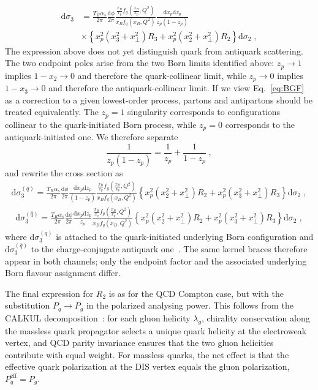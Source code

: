 \documentclass[a4paper,11pt]{article}
\begin{document}
\begin{align}\label{eq:BGF}
  \mathrm{d}\sigma_3 &= \frac{T_R\alpha_s}{2\pi}\frac{\mathrm{d}\phi}{2\pi}
    \frac{\frac{x_B}{x_p} f_g\!\left(\frac{x_B}{x_p},Q^2\right)}{ x_B f_q\!\left( x_B ,Q^2\right)}
    \frac{\mathrm{d} x_p \mathrm{d}z_p}{z_p(1-z_p)} \\\nonumber
    & \times \left\{ x_p^2 ( x_3^2 + x_\perp^2 ) R_3 +
        x_p^2 (x_2^2 + x_\perp^2) R_2 \right\} \mathrm{d} \sigma_2\;,
\end{align}
The expression above does not yet distinguish quark from antiquark scattering. The two endpoint poles arise from the two Born limits identified above: $z_p\to1$ implies $1-x_2\to0$ and therefore the quark-collinear limit, while $z_p\to0$ implies $1-x_3\to0$ and therefore the antiquark-collinear limit. If we
view Eq.~\eqref{eq:BGF} as a correction to a given lowest-order process,
partons and antipartons should be treated equivalently. The $z_p = 1$ singularity corresponds to configurations collinear to the quark-initiated Born process, while $z_p = 0$ corresponds to the antiquark-initiated one. We therefore separate
\begin{equation}
\frac{1}{z_{p}(1-z_{p})}=\frac{1}{z_{p}}+\frac{1}{1-z_{p}}\;,
\label{eq:zp-partfrac}
\end{equation}
and rewrite the cross section as
\begin{align}
\mathrm{d}\sigma_3^{(q)} = \frac{T_R\alpha_s}{2\pi}\frac{\mathrm{d}\phi}{2\pi}
\frac{\mathrm{d}x_p\mathrm{d}z_p}{(1-z_p)} \frac{\frac{x_B}{x_p}f_g(\frac{x_B}{x_p}, Q^2)}{x_Bf_q(x_B, Q^2)}
\left\{x_p^2(x_2^2+x_\perp^2)R_2+x_p^2(x_3^2+x_\perp^2)R_3\right\}\mathrm{d} \sigma_2\;,
\end{align}
\begin{align}
\mathrm{d}\sigma_3^{(\bar q)} = \frac{T_R\alpha_s}{2\pi}\frac{\mathrm{d}\phi}{2\pi}
\frac{\mathrm{d}x_p\mathrm{d}z_p}{z_p} \frac{\frac{x_B}{x_p}f_g(\frac{x_B}{x_p}, Q^2)}{x_Bf_q(x_B, Q^2)}
\left\{x_p^2(x_2^2+x_\perp^2)R_2+x_p^2(x_3^2+x_\perp^2)R_3\right\}\mathrm{d} \sigma_2\;,
\end{align}
where $\mathrm{d}\sigma_3^{(q)}$ is attached to the quark-initiated underlying Born configuration and $\mathrm{d}\sigma_3^{(\bar q)}$ to the charge-conjugate antiquark one~\cite{Seymour:1994we,Seymour:1994ti}. The same kernel braces therefore appear in both channels; only the endpoint factor and the associated underlying Born flavour assignment differ.

The final expression for $R_2$ is as for the QCD Compton case, but with the substitution $P_q \rightarrow P_g$ in the polarized analysing power.  This follows from the CALKUL decomposition~\cite{DeCausmaecker:1981jtq}: for each gluon helicity $\lambda_g$, chirality conservation along the massless quark propagator selects a unique quark helicity at the electroweak vertex, and QCD parity invariance ensures that the two gluon helicities contribute with equal weight. For massless quarks, the net effect is that the effective quark polarization at the DIS vertex equals the gluon polarization, $P_q^{\mathrm{eff}}=P_g$.
\end{document}
